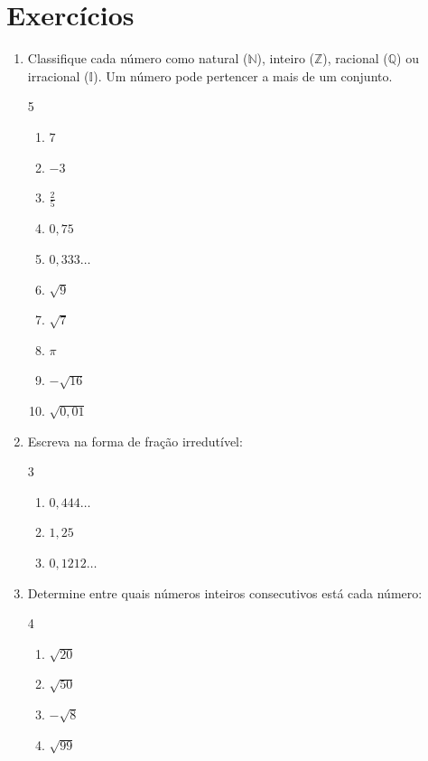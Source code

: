 \documentclass[11pt,a4paper]{article}
\begin{document}
\section{Exercícios}
\begin{enumerate}[label=\textbf{\arabic*.}]

  \item Classifique cada número como natural ($\mathbb{N}$), inteiro ($\mathbb{Z}$),
  racional ($\mathbb{Q}$) ou irracional ($\mathbb{I}$). Um número pode
  pertencer a mais de um conjunto.
  \begin{multicols}{5}
  \begin{enumerate}[label=\alph*)]
    \item $7$
    \item $-3$
    \item $\frac{2}{5}$
    \item $0{,}75$
    \item $0{,}333\ldots$
    \item $\sqrt{9}$
    \item $\sqrt{7}$
    \item $\pi$
    \item $-\sqrt{16}$
    \item $\sqrt{0{,}01}$
  \end{enumerate}
  \end{multicols}

  \item Escreva na forma de fração irredutível:
  \begin{multicols}{3}
  \begin{enumerate}[label=\alph*)]
    \item $0{,}444\ldots$
    \item $1{,}25$
    \item $0{,}1212\ldots$
  \end{enumerate}
  \end{multicols}

  \item Determine entre quais números inteiros consecutivos está cada número:
  \begin{multicols}{4}
  \begin{enumerate}[label=\alph*)]
    \item $\sqrt{20}$
    \item $\sqrt{50}$
    \item $-\sqrt{8}$
    \item $\sqrt{99}$
  \end{enumerate}
  \end{multicols}


\end{enumerate}
\end{document}
